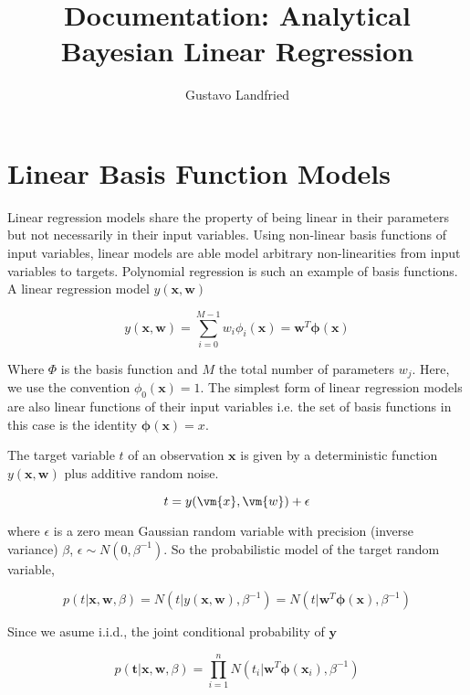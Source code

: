 \documentclass[a4paper,10pt]{article}
\title{Documentation: Analytical Bayesian Linear Regression}
\author{Gustavo Landfried}
\begin{document}
\maketitle

\section{Linear Basis Function Models}

Linear regression models share the property of being linear in their parameters but not necessarily in their input variables.
Using non-linear basis functions of input variables, linear models are able model arbitrary non-linearities from input variables to targets.  
Polynomial regression is such an example of basis functions.
A linear regression model $y(\bm{x},\bm{w})$

\begin{equation}
y(\bm{x},\bm{w}) = \sum_{i=0}^{M-1} w_i \phi_i(\bm{x}) = \bm{w}^T \bm{\phi}(\bm{x})
\end{equation}

Where $\Phi$ is the basis function and $M$ the total number of parameters $w_j$.
Here, we use the convention $\phi_0(\bm{x})=1$.
The simplest form of linear regression models are also linear functions of their input variables i.e. the set of basis functions in this case is the identity $\bm{\phi}(\bm{x})=x$. 

The target variable $t$ of an observation $\bm{x}$ is given by a deterministic function $y(\bm{x},\bm{w})$ plus additive random noise.

\begin{equation}
 t = y(\vm{x},\vm{w}) + \epsilon
\end{equation}

where $\epsilon$ is a zero mean Gaussian random variable with precision (inverse variance) $\beta$, $\epsilon \sim N(0,\beta^{-1})$.
So the probabilistic model of the target random variable,

\begin{equation}
p(t | \bm{x}, \bm{w}, \beta) = N(t | y(\bm{x},\bm{w}), \beta^{-1}) = N(t | \bm{w}^T \bm{\phi}(\bm{x}) , \beta^{-1})
\end{equation}

Since we asume i.i.d., the joint conditional probability of $\bm{y}$

\begin{equation}
p(\bm{t} | \bm{x}, \bm{w}, \beta) = \prod_{i=1}^n N(t_i | \bm{w}^T \bm{\phi}(\bm{x}_i) , \beta^{-1})
\end{equation}
\end{document}
